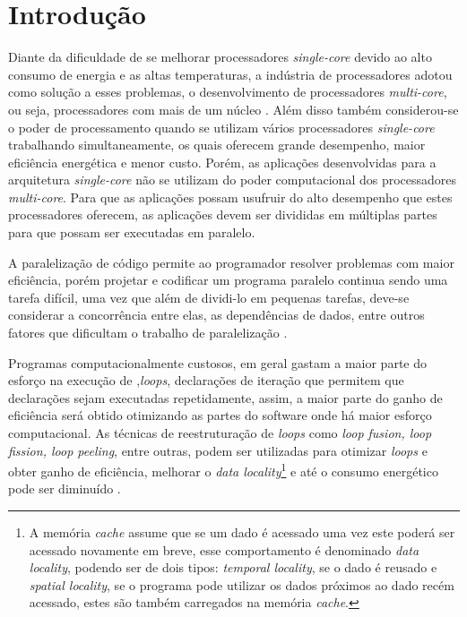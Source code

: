 \chapter{Introdução}

Diante da  dificuldade de se melhorar processadores \textit{single-core} devido 
ao alto consumo de energia e as altas temperaturas, a indústria de processadores 
adotou como solução a esses problemas, o desenvolvimento de processadores 
\textit{multi-core}, ou seja, processadores com mais de um núcleo \cite{aapc}. 
Além disso também considerou-se o poder de processamento 
quando se utilizam vários processadores \textit{single-core} trabalhando 
simultaneamente, os quais oferecem grande desempenho, maior eficiência energética 
e menor custo.
Porém, as aplicações desenvolvidas para a arquitetura \textit{single-core} não 
se utilizam do poder computacional dos processadores \textit{multi-core}.
Para que as aplicações possam usufruir do alto desempenho que estes processadores 
oferecem, as aplicações devem ser divididas em múltiplas partes para que possam 
ser executadas em paralelo.

A paralelização de código permite ao programador resolver problemas com maior 
eficiência, porém projetar e codificar um programa paralelo continua sendo uma 
tarefa difícil, uma vez que além de dividi-lo em pequenas tarefas, deve-se 
considerar a concorrência entre elas, as dependências de dados, entre outros 
fatores que dificultam o trabalho de paralelização \cite{aipp}.

Programas computacionalmente custosos, em geral gastam a maior parte do esforço 
na execução de ,\textit{loops}, declarações de iteração que permitem que
declarações sejam executadas repetidamente, assim, a maior parte do ganho de 
eficiência será obtido otimizando as partes do software onde há maior esforço 
computacional.
As técnicas de reestruturação de \textit{loops} como \textit{loop 
fusion, loop fission, loop peeling}, entre outras, podem ser utilizadas para
otimizar \textit{loops} e obter ganho de eficiência, melhorar o 
\textit{data locality}\footnote{A
        memória \textit{cache} assume que se um dado é acessado uma vez este 
        poderá ser acessado novamente em breve, esse comportamento é denominado 
        \textit{data locality}, podendo ser de dois tipos:
        \textit{temporal locality}, se o
        dado é reusado e \textit{spatial locality}, se o programa pode utilizar
        os dados próximos ao dado recém acessado, estes são também carregados
        na memória \textit{cache}.
}
e até o consumo energético pode ser diminuído \cite{Liu:2004}.

